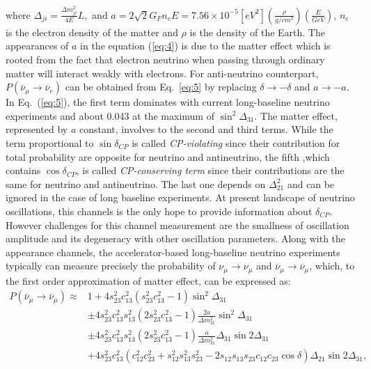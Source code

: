 \documentclass[a4 paper,12pt]{report}%
\begin{document}
 where $\Delta_{ji} = \frac{\Delta m^2_{ji}}{4E}L,$ and $a = 2\sqrt{2}G_Fn_eE = 7.56\times 10^{-5}[eV^2](\frac{\rho}{g/cm^3})(\frac{E}{GeV})$, $n_e$ is the electron density of the matter and $\rho$ is the density of the Earth. The appearances of $a$ in the equation (\ref{eq:4}) is due to the matter effect which is rooted from the fact that electron neutrino when passing through ordinary matter will interact  weakly with electrons. For anti-neutrino counterpart,$P(\overline{\nu}_\mu \rightarrow \overline{\nu}_e)$ can be obtained from Eq.~\ref{eq:5} by replacing $\delta \rightarrow - \delta$ and $a \rightarrow -a$. In Eq.~(\ref{eq:5}), the first term dominates with current long-baseline neutrino experiments and about 0.043 at the maximum of $\sin^2\Delta_{31}$. The matter effect, represented by $a$ constant, involves to the second and third terms. While the term proportional to $\sin \delta_{CP}$ is called \textit{CP-violating} since their contribution for total probability are opposite for neutrino and antineutrino, the fifth ,which contains $\cos\delta_{CP}$, is called \textit{CP-conserving term} since their contributions are the same for neutrino and antineutrino. The last one depends on $\Delta^2_{21}$ and can be ignored in the case of long baseline experiments. At present landscape of neutrino oscillations, this channels is the only hope to provide information about $\delta_{CP}$. However challenges for this channel measurement are the smallness of oscillation amplitude and its degeneracy with other oscillation parameters. Along with the appearance channels, the accelerator-based long-baseline neutrino experiments typically can measure precisely the probability of $\nu_\mu \rightarrow \nu_\mu$ and $\overline{\nu}_\mu \rightarrow \overline{\nu}_\mu$, which, to the first order approximation of matter effect, can be expressed as:
\begin{eqnarray}\label{eq:4} \nonumber
P(\bar{\nu}_{\mu} \rightarrow \bar{\nu}_{\mu}) \approx &1 + 4s^2_{23}c^2_{13}(s^2_{23}c^2_{13}-1)\sin^2\Delta_{31}\\
&\pm 4s^2_{23}c^2_{13}s^2_{13}\left(2s^2_{23}c^2_{13}-1\right)\frac{2a}{\Delta m^2_{31}}\sin^2\Delta_{31}\\  \nonumber
&\pm 4s^2_{23}c^2_{13}s_{13}^2\left(2s^2_{23}c^2_{13}-1\right) \frac{a}{\Delta m^2_{31}}\Delta_{31}\sin2\Delta_{31} \\ \nonumber
&+4s^2_{23}c^2_{13}(c^2_{12}c^2_{23} + s^2_{12}s^2_{13}s^2_{23}-2s_{12}s_{13}s_{23}c_{12}c_{23}\cos\delta)\Delta_{21}\sin2\Delta_{31},
\end{eqnarray}
\end{document}
